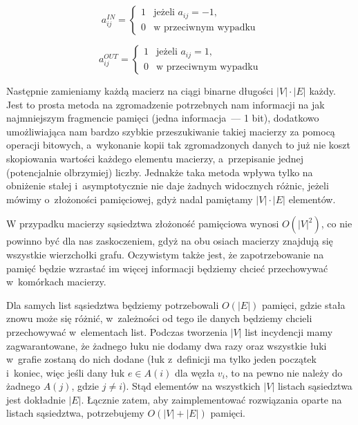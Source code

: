 \begin{equation}
	a^{IN}_{ij}= \left\{ 
	\begin{array}{ll}
	1 & \textrm{jeżeli $a_{ij} = -1$,}\\
	0 & \textrm{w przeciwnym wypadku}
	\end{array} \right.
	\label{eq:matrixIN}
\end{equation}

\begin{equation}
	a^{OUT}_{ij}= \left\{ 
	\begin{array}{ll}
	1 & \textrm{jeżeli $a_{ij} = 1$,}\\
	0 & \textrm{w przeciwnym wypadku}
	\end{array} \right.
	\label{eq:matrixOUT}
\end{equation}

Następnie zamieniamy każdą macierz na ciągi binarne długości $ \left| V \right| \cdot \left| E \right| $ każdy. Jest to prosta metoda na zgromadzenie potrzebnych nam informacji na jak najmniejszym fragmencie pamięci (jedna informacja~---  1 bit), dodatkowo umożliwiająca nam bardzo szybkie przeszukiwanie takiej macierzy za pomocą operacji bitowych, a~wykonanie kopii tak zgromadzonych danych to już nie koszt skopiowania wartości każdego elementu macierzy, a~przepisanie jednej (potencjalnie olbrzymiej) liczby. Jednakże taka metoda wpływa tylko na obniżenie stałej i~asymptotycznie nie daje żadnych widocznych różnic, jeżeli mówimy o~złożoności pamięciowej, gdyż nadal pamiętamy $\left| V \right| \cdot \left| E \right|$ elementów.

W przypadku macierzy sąsiedztwa złożoność pamięciowa wynosi $O \left( \left| V \right| ^{2} \right) $, co nie powinno być dla nas zaskoczeniem, gdyż na obu osiach macierzy znajdują się wszystkie wierzchołki grafu. Oczywistym także jest, że zapotrzebowanie na pamięć będzie wzrastać im więcej informacji będziemy chcieć przechowywać w~komórkach macierzy.

Dla samych list sąsiedztwa będziemy potrzebowali $O \left( \left| E \right| \right) $ pamięci, gdzie stała znowu może się różnić, w~zależności od tego ile danych będziemy chcieli przechowywać w~elementach list. Podczas tworzenia $ \left| V \right| $ list incydencji mamy zagwarantowane, że żadnego łuku nie dodamy dwa razy oraz wszystkie łuki w~grafie zostaną do nich dodane (łuk z~definicji ma tylko jeden początek i~koniec, więc jeśli dany łuk $e \in A \left( i \right)$ dla węzła $v_{i}$, to na pewno nie należy do żadnego $A \left( j \right)$, gdzie $j \neq i$). Stąd elementów na wszystkich $ \left| V \right| $ listach sąsiedztwa jest dokładnie $ \left| E \right| $. Łącznie zatem, aby zaimplementować rozwiązania oparte na listach sąsiedztwa, potrzebujemy $ O \left( \left| V \right| + \left| E \right| \right)$ pamięci.

